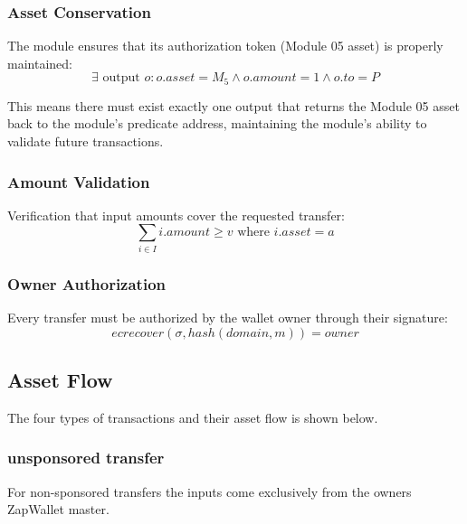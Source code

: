 \subsubsection{Asset Conservation}
The module ensures that its authorization token (Module 05 asset) is properly maintained:
\[ \exists \text{ output } o : o.asset = M_5 \land o.amount = 1 \land o.to = P \]

This means there must exist exactly one output that returns the Module 05 asset back to the module's predicate address,
maintaining the module's ability to validate future transactions.

\subsubsection{Amount Validation}
Verification that input amounts cover the requested transfer:
\[ \sum_{i \in I} i.amount \geq v \text{ where } i.asset = a \]


\subsubsection{Owner Authorization}
Every transfer must be authorized by the wallet owner through their signature:
\[ ecrecover(\sigma, hash(domain, m)) = owner \]




%
\subsection{Asset Flow}

The four types of transactions and their asset flow is shown below. \\


\subsubsection{unsponsored  transfer}
For non-sponsored  transfers the inputs come exclusively from the owners ZapWallet master.\\


